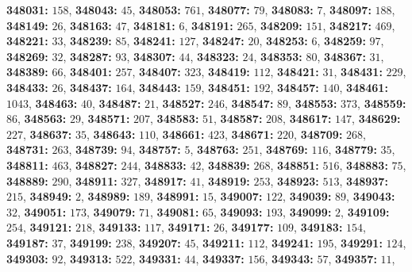 \textsf{\bfseries 348031:} $158$, \textsf{\bfseries 348043:} $45$, \textsf{\bfseries 348053:} $761$, \textsf{\bfseries 348077:} $79$, \textsf{\bfseries 348083:} $7$, \textsf{\bfseries 348097:} $188$, \textsf{\bfseries 348149:} $26$, \textsf{\bfseries 348163:} $47$, \textsf{\bfseries 348181:} $6$, \textsf{\bfseries 348191:} $265$, \textsf{\bfseries 348209:} $151$, \textsf{\bfseries 348217:} $469$, \textsf{\bfseries 348221:} $33$, \textsf{\bfseries 348239:} $85$, \textsf{\bfseries 348241:} $127$, \textsf{\bfseries 348247:} $20$, \textsf{\bfseries 348253:} $6$, \textsf{\bfseries 348259:} $97$, \textsf{\bfseries 348269:} $32$, \textsf{\bfseries 348287:} $93$, \textsf{\bfseries 348307:} $44$, \textsf{\bfseries 348323:} $24$, \textsf{\bfseries 348353:} $80$, \textsf{\bfseries 348367:} $31$, \textsf{\bfseries 348389:} $66$, \textsf{\bfseries 348401:} $257$, \textsf{\bfseries 348407:} $323$, \textsf{\bfseries 348419:} $112$, \textsf{\bfseries 348421:} $31$, \textsf{\bfseries 348431:} $229$, \textsf{\bfseries 348433:} $26$, \textsf{\bfseries 348437:} $164$, \textsf{\bfseries 348443:} $159$, \textsf{\bfseries 348451:} $192$, \textsf{\bfseries 348457:} $140$, \textsf{\bfseries 348461:} $1043$, \textsf{\bfseries 348463:} $40$, \textsf{\bfseries 348487:} $21$, \textsf{\bfseries 348527:} $246$, \textsf{\bfseries 348547:} $89$, \textsf{\bfseries 348553:} $373$, \textsf{\bfseries 348559:} $86$, \textsf{\bfseries 348563:} $29$, \textsf{\bfseries 348571:} $207$, \textsf{\bfseries 348583:} $51$, \textsf{\bfseries 348587:} $208$, \textsf{\bfseries 348617:} $147$, \textsf{\bfseries 348629:} $227$, \textsf{\bfseries 348637:} $35$, \textsf{\bfseries 348643:} $110$, \textsf{\bfseries 348661:} $423$, \textsf{\bfseries 348671:} $220$, \textsf{\bfseries 348709:} $268$, \textsf{\bfseries 348731:} $263$, \textsf{\bfseries 348739:} $94$, \textsf{\bfseries 348757:} $5$, \textsf{\bfseries 348763:} $251$, \textsf{\bfseries 348769:} $116$, \textsf{\bfseries 348779:} $35$, \textsf{\bfseries 348811:} $463$, \textsf{\bfseries 348827:} $244$, \textsf{\bfseries 348833:} $42$, \textsf{\bfseries 348839:} $268$, \textsf{\bfseries 348851:} $516$, \textsf{\bfseries 348883:} $75$, \textsf{\bfseries 348889:} $290$, \textsf{\bfseries 348911:} $327$, \textsf{\bfseries 348917:} $41$, \textsf{\bfseries 348919:} $253$, \textsf{\bfseries 348923:} $513$, \textsf{\bfseries 348937:} $215$, \textsf{\bfseries 348949:} $2$, \textsf{\bfseries 348989:} $189$, \textsf{\bfseries 348991:} $15$, \textsf{\bfseries 349007:} $122$, \textsf{\bfseries 349039:} $89$, \textsf{\bfseries 349043:} $32$, \textsf{\bfseries 349051:} $173$, \textsf{\bfseries 349079:} $71$, \textsf{\bfseries 349081:} $65$, \textsf{\bfseries 349093:} $193$, \textsf{\bfseries 349099:} $2$, \textsf{\bfseries 349109:} $254$, \textsf{\bfseries 349121:} $218$, \textsf{\bfseries 349133:} $117$, \textsf{\bfseries 349171:} $26$, \textsf{\bfseries 349177:} $109$, \textsf{\bfseries 349183:} $154$, \textsf{\bfseries 349187:} $37$, \textsf{\bfseries 349199:} $238$, \textsf{\bfseries 349207:} $45$, \textsf{\bfseries 349211:} $112$, \textsf{\bfseries 349241:} $195$, \textsf{\bfseries 349291:} $124$, \textsf{\bfseries 349303:} $92$, \textsf{\bfseries 349313:} $522$, \textsf{\bfseries 349331:} $44$, \textsf{\bfseries 349337:} $156$, \textsf{\bfseries 349343:} $57$, \textsf{\bfseries 349357:} $11$, 
